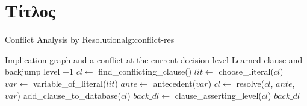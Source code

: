\section{Τίτλος}

\begin{myalgorithm}{Conflict Analysis by Resolution}{alg:conflict-res}
\begin{algorithmic}[1]
    \Require Implication graph and a conflict at the current decision level
    \Ensure Learned clause and backjump level
            \State \Return $-1$
        \EndIf
        \State $cl \gets$ find\_conflicting\_clause()
            \State $lit \gets$ choose\_literal($cl$)
            \State $var \gets$ variable\_of\_literal($lit$)
            \State $ante \gets$ antecedent($var$)
            \State $cl \gets$ resolve($cl$, $ante$, $var$)
        \EndWhile
        \State add\_clause\_to\_database($cl$)
        \State $back\_dl \gets$ clause\_asserting\_level($cl$)
        \State \Return $back\_dl$
    \EndFunction
    \end{algorithmic}
\end{myalgorithm}

